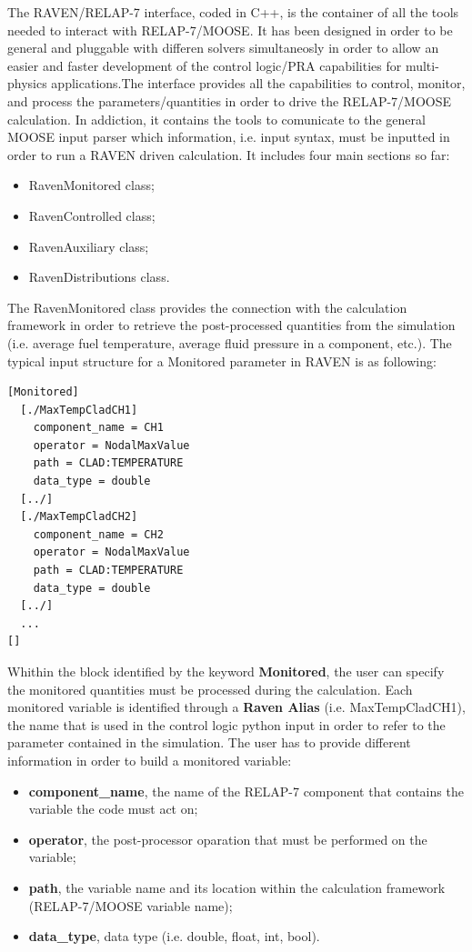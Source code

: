 \documentclass{mc2013}
\begin{document}
\label{sec:interface}
The RAVEN/RELAP-7 interface, coded in C++, is the container of all the tools needed to interact with RELAP-7/MOOSE. It has been designed in order to be general and pluggable with differen solvers simultaneosly in order to allow an easier and faster development of the control logic/PRA capabilities for multi-physics applications.The interface provides all the capabilities to control, monitor, and process the parameters/quantities in order to drive the RELAP-7/MOOSE calculation. In addiction, it contains the tools to comunicate to the general MOOSE input parser which information, i.e. input syntax, must be inputted in order to run a RAVEN driven calculation. It includes four main sections so far:
\begin{itemize}
\item RavenMonitored class;
\item RavenControlled class;
\item RavenAuxiliary class;
\item RavenDistributions class.
\end{itemize}
The RavenMonitored class provides the connection with the calculation framework in order to retrieve the post-processed quantities from the simulation (i.e. average fuel temperature, average fluid pressure in a component, etc.). The typical input structure for a Monitored parameter in RAVEN is as following:
\begin{lstlisting}
[Monitored]
  [./MaxTempCladCH1]
    component_name = CH1
    operator = NodalMaxValue
    path = CLAD:TEMPERATURE
    data_type = double
  [../]
  [./MaxTempCladCH2]
    component_name = CH2
    operator = NodalMaxValue
    path = CLAD:TEMPERATURE
    data_type = double
  [../]
  ...
[]
\end{lstlisting}
Whithin the block identified by the keyword \textbf{Monitored}, the user can specify the monitored quantities must be processed during the calculation. Each monitored variable is identified through a \textbf{Raven Alias} (i.e. MaxTempCladCH1), the name that is used in the control logic python input in order to refer to the parameter contained in the simulation.
The user has to provide different information in order to build a monitored variable:
\begin{itemize}
  \item \textbf{component\_name}, the name of the RELAP-7 component that contains the variable the code must act on;
  \item \textbf{operator}, the post-processor oparation that must be performed on the variable;
  \item \textbf{path}, the variable name and its location within the calculation framework (RELAP-7/MOOSE variable name);
  \item \textbf{data\_type}, data type (i.e. double, float, int, bool).
\end{itemize}
\end{document}
